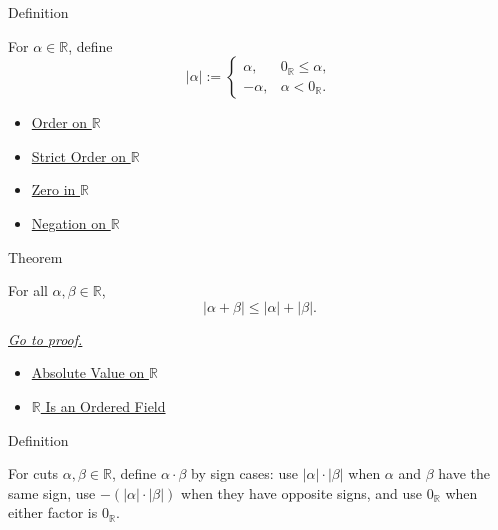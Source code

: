 \begin{definitionbox}{Definition}
\begin{definition}
\label{def:real-chapter-absolute-value-on-r}
For $\alpha\in\mathbb{R}$, define
\[
|\alpha|:=
\begin{cases}
\alpha, & 0_{\mathbb{R}}\le\alpha,\\
-\alpha, & \alpha<0_{\mathbb{R}}.
\end{cases}
\]
\end{definition}
\end{definitionbox}

\begin{dependencies}
\begin{itemize}
  \item \hyperref[def:order-on-r]{Order on $\mathbb{R}$}
  \item \hyperref[def:strict-order-on-r]{Strict Order on $\mathbb{R}$}
  \item \hyperref[def:zero-in-r]{Zero in $\mathbb{R}$}
  \item \hyperref[def:negation-on-r]{Negation on $\mathbb{R}$}
\end{itemize}
\end{dependencies}

\begin{theorembox}{Theorem}
\begin{theorem}
\label{thm:triangle-inequality}
For all $\alpha,\beta\in\mathbb{R}$,
\[
|\alpha+\beta|\le |\alpha|+|\beta|.
\]

\smallskip\noindent
\hyperref[prf:triangle-inequality]{\textit{Go to proof.}}
\end{theorem}
\end{theorembox}

\begin{dependencies}
\begin{itemize}
  \item \hyperref[def:real-chapter-absolute-value-on-r]{Absolute Value on $\mathbb{R}$}
  \item \hyperref[thm:r-is-an-ordered-field]{$\mathbb{R}$ Is an Ordered Field}
\end{itemize}
\end{dependencies}

\begin{definitionbox}{Definition}
\begin{definition}
\label{def:multiplication-on-r}
For cuts $\alpha,\beta\in\mathbb{R}$, define $\alpha\cdot\beta$ by sign cases:
use $|\alpha|\cdot|\beta|$ when $\alpha$ and $\beta$ have the same sign, use
$-(|\alpha|\cdot|\beta|)$ when they have opposite signs, and use
$0_{\mathbb{R}}$ when either factor is $0_{\mathbb{R}}$.
\end{definition}
\end{definitionbox}

